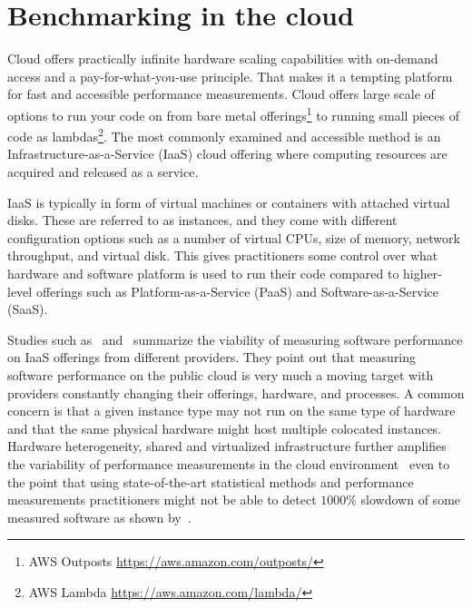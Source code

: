 \section{Benchmarking in the cloud}
Cloud offers practically infinite hardware scaling capabilities with on-demand access and a \mbox{pay-for-what-you-use} principle.
That makes it a tempting platform for fast and accessible performance measurements.
Cloud offers large scale of options to run your code on from bare metal offerings\footnote{AWS Outposts \url{https://aws.amazon.com/outposts/}} to running small pieces of code as lambdas\footnote{AWS Lambda \url{https://aws.amazon.com/lambda/}}.
The most commonly examined and accessible method is an \mbox{Infrastructure-as-a-Service} (IaaS) cloud offering where computing resources are acquired and released as a service.

IaaS is typically in form of virtual machines or containers with attached virtual disks.
These are referred to as instances, and they come with different configuration options such as a number of virtual CPUs, size of memory, network throughput, and virtual disk.
This gives practitioners some control over what hardware and software platform is used to run their code compared to higher-level offerings such as Platform-as-a-Service (PaaS) and Software-as-a-Service (SaaS).

Studies such as~\citet{leitner2016patterns} and~\citet{laaber2019software} summarize the viability of measuring software performance on IaaS offerings from different providers.
They point out that measuring software performance on the public cloud is very much a moving target with providers constantly changing their offerings, hardware, and processes.
A common concern is that a given instance type may not run on the same type of hardware and that the same physical hardware might host multiple colocated instances.
Hardware heterogeneity, shared and virtualized infrastructure further amplifies the variability of performance measurements in the cloud environment~\cite{leitner2016patterns} even to the point that using state-of-the-art statistical methods and performance measurements practitioners might not be able to detect $1000\%$ slowdown of some measured software as shown by~\citet{laaber2019software}.


